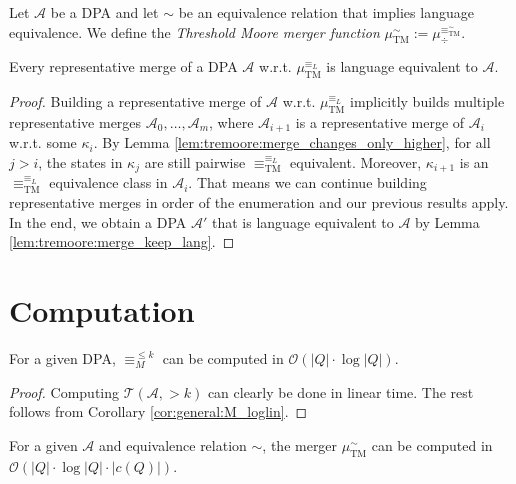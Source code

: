 \vspace{10pt}

\begin{defn}
	Let $\mathcal{A}$ be a DPA and let $\sim$ be an equivalence relation that implies language equivalence. We define the \emph{Threshold Moore merger function} $\mu_\text{TM}^\sim := \mu_\div^{\equiv^\sim_\text{TM}}$.
\end{defn}

\begin{theorem}
	Every representative merge of a DPA $\mathcal{A}$ w.r.t. $\mu_\text{TM}^{\equiv_L}$ is language equivalent to $\mathcal{A}$.
\end{theorem}

\begin{proof}
	Building a representative merge of $\mathcal{A}$ w.r.t. $\mu_\text{TM}^{\equiv_L}$ implicitly builds multiple representative merges $\mathcal{A}_0, \dots, \mathcal{A}_m$, where $\mathcal{A}_{i+1}$ is a representative merge of $\mathcal{A}_i$ w.r.t. some $\kappa_i$. By Lemma \ref{lem:tremoore:merge_changes_only_higher}, for all $j > i$, the states in $\kappa_j$ are still pairwise $\equiv^{\equiv_L}_\text{TM}$ equivalent. Moreover, $\kappa_{i+1}$ is an $\equiv^{\equiv_L}_\text{TM}$ equivalence class in $\mathcal{A}_i$. That means we can continue building representative merges in order of the enumeration and our previous results apply. In the end, we obtain a DPA $\mathcal{A}'$ that is language equivalent to $\mathcal{A}$ by Lemma \ref{lem:tremoore:merge_keep_lang}.
\end{proof}

\section{Computation}
\begin{lem}
	For a given DPA, $\equiv_M^{\leq k}$ can be computed in $\mathcal{O}(|Q| \cdot \log |Q|)$.
	\label{lem:tremoore:kmoore_loglin}
\end{lem}

\begin{proof}
	Computing $\mathcal{T}(\mathcal{A}, >k)$ can clearly be done in linear time. The rest follows from Corollary \ref{cor:general:M_loglin}.
\end{proof}

\begin{lem}
	For a given $\mathcal{A}$ and equivalence relation $\sim$, the merger $\mu_\text{TM}^\sim$ can be computed in \linebreak 
	$\mathcal{O}(|Q| \cdot \log |Q| \cdot |c(Q)|)$.
\end{lem}

